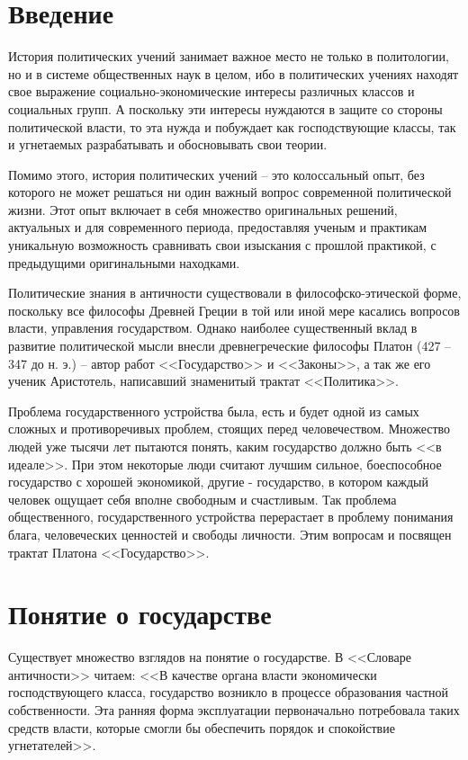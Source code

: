 \chapter{Введение}

	История политических учений занимает важное место не только в политологии, 
	но и в системе общественных наук в целом, ибо в политических учениях 
	находят свое выражение социально-экономические интересы различных классов 
	и социальных групп. А поскольку эти интересы нуждаются в защите со 
	стороны политической власти, то эта нужда и побуждает как господствующие 
	классы, так и угнетаемых разрабатывать и обосновывать свои теории.

	Помимо этого, история политических учений -- это колоссальный опыт, без 
	которого не может решаться ни один важный вопрос современной политической 
	жизни. Этот опыт включает в себя множество оригинальных решений, 
	актуальных и для современного периода, предоставляя ученым и практикам 
	уникальную возможность сравнивать свои изыскания с прошлой практикой, с 
	предыдущими оригинальными находками.

	Политические знания в античности существовали в философско-этической форме, 
	поскольку все философы Древней Греции в той или иной мере касались вопросов 
	власти, управления государством. Однако наиболее существенный вклад в 
	развитие политической мысли внесли древнегреческие философы Платон 
	(427 -- 347 до н. э.) -- автор работ <<Государство>> и <<Законы>>, а так же 
	его ученик Аристотель, написавший знаменитый трактат <<Политика>>.

	Проблема государственного устройства была, есть и будет одной из самых сложных 
	и противоречивых проблем, стоящих перед человечеством. Множество людей уже 
	тысячи лет пытаются понять, каким государство должно быть <<в идеале>>. При этом 
	некоторые люди считают лучшим сильное, боеспособное государство с хорошей 
	экономикой, другие - государство, в котором каждый человек ощущает себя вполне 
	свободным и счастливым. Так проблема общественного, государственного устройства 
	перерастает в проблему понимания блага, человеческих ценностей и свободы 
	личности. Этим вопросам и посвящен трактат Платона <<Государство>>.

\pagebreak
\chapter{Понятие о государстве}

	Существует множество взглядов на понятие о государстве. В <<Словаре 
	античности>> читаем: <<В качестве органа власти экономически 
	господствующего класса, государство возникло в процессе образования 
	частной собственности. Эта ранняя форма эксплуатации первоначально 
	потребовала таких средств власти, которые смогли бы обеспечить порядок 
	и спокойствие угнетателей>>. 

